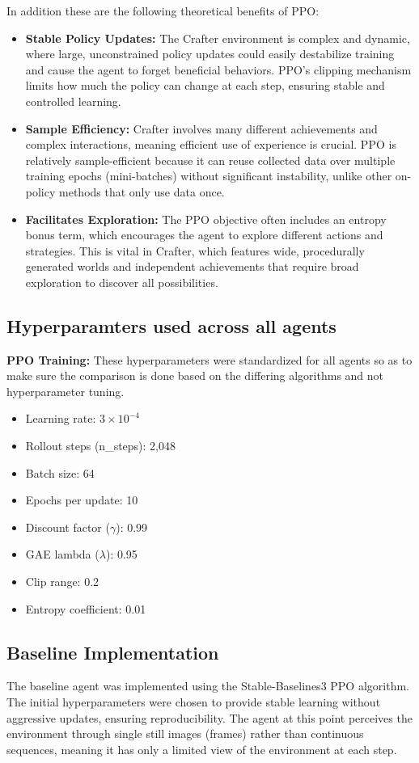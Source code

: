 \documentclass[twocolumn]{article}
\begin{document}
In addition these are the following theoretical benefits of PPO:
\begin{itemize}
    \item \textbf{Stable Policy Updates:} The Crafter environment is complex and dynamic, where large, unconstrained policy updates could easily destabilize training and cause the agent to forget beneficial behaviors. PPO's clipping mechanism limits how much the policy can change at each step, ensuring stable and controlled learning.
    \item \textbf{Sample Efficiency:} Crafter involves many different achievements and complex interactions, meaning efficient use of experience is crucial. PPO is relatively sample-efficient because it can reuse collected data over multiple training epochs (mini-batches) without significant instability, unlike other on-policy methods that only use data once.
    \item \textbf{Facilitates Exploration:} The PPO objective often includes an entropy bonus term, which encourages the agent to explore different actions and strategies. This is vital in Crafter, which features wide, procedurally generated worlds and independent achievements that require broad exploration to discover all possibilities.
\end{itemize}

\subsection*{Hyperparamters used across all agents}
\textbf{PPO Training:} These hyperparameters were standardized for all agents so as to make sure the comparison is done based on the differing algorithms and not hyperparameter tuning.
\begin{itemize}
    \item Learning rate: $3 \times 10^{-4}$
    \item Rollout steps (n\_steps): 2,048
    \item Batch size: 64
    \item Epochs per update: 10
    \item Discount factor ($\gamma$): 0.99
    \item GAE lambda ($\lambda$): 0.95
    \item Clip range: 0.2
    \item Entropy coefficient: 0.01
\end{itemize}

\subsection*{Baseline Implementation}
The baseline agent was implemented using the Stable-Baselines3 PPO algorithm. The initial hyperparameters were chosen to provide stable learning without aggressive updates, ensuring reproducibility. The agent at this point perceives the environment through single still images (frames) rather than continuous sequences, meaning it has only a limited view of the environment at each step.
\end{document}
